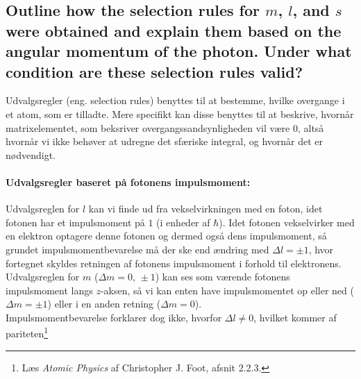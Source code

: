 \subsection{Outline how the selection rules for $m$, $l$, and $s$ were obtained and explain them based on the angular momentum of the photon. Under what condition are these selection rules valid?}


Udvalgsregler (eng. selection rules) benyttes til at bestemme, hvilke overgange i et atom, som er tilladte. Mere specifikt kan disse benyttes til at beskrive, hvornår matrixelementet, som beksriver overgangssandsynligheden vil være 0, altså hvornår vi ikke behøver at udregne det sfæriske integral, og hvornår det er nødvendigt.\\


\paragraph{Udvalgsregler baseret på fotonens impulsmoment:} Udvalgsreglen for $l$ kan vi finde ud fra vekselvirkningen med en foton, idet fotonen har et impulsmoment på $1$ (i enheder af $\hbar$). Idet fotonen vekselvirker med en elektron optagere denne fotonen og dermed også dens impulsmoment, så grundet impulsmomentbevarelse må der ske end ændring med $\Delta l = \pm 1$, hvor fortegnet skyldes retningen af fotonens impulsmoment i forhold til elektronens.\\
Udvalgsreglen for $m$ ($\Delta m = 0,\, \pm 1$) kan ses som værende fotonens impulsmoment langs $z$-aksen, så vi kan enten have impulsmomentet op eller ned ($\Delta m = \pm 1$) eller i en anden retning ($\Delta m = 0$).\\
Impulsmomentbevarelse forklarer dog ikke, hvorfor $\Delta l \ne 0$, hvilket kommer af pariteten\footnote{Læs \textit{Atomic Physics} af Christopher J. Foot, afsnit 2.2.3.}


